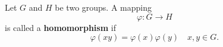 Let $G$ and $H$ be two groups. A mapping
$$\varphi: G \rightarrow H$$
is called a \textbf{homomorphism} if
$$\varphi(xy) = \varphi(x)\varphi(y) \quad x, y \in G.$$
